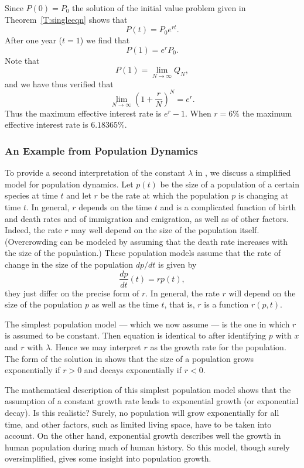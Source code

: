 \documentclass{ximera}
\begin{document}
Since $P(0)=P_0$ the solution of the initial value problem given
in Theorem~\ref{T:singleeqn} shows that
\[
P(t) = P_0 e^{rt}.
\]
After one year ($t=1$) we find that
\[
P(1) =  e^r P_0.
\]
Note that
\[
P(1) = \lim_{N\to\infty} Q_N,
\]
and we have thus verified that
\[
 \lim_{N\to\infty} \left(1 + \frac{r}{N}\right)^N = e^r.
\]
Thus the maximum effective interest rate is $e^r-1$.  When $r=6\%$
the maximum effective interest rate is $6.18365\%$.


\subsubsection*{An Example from Population Dynamics}

To provide a second interpretation of the constant $\lambda$ in
, we discuss a simplified model for population dynamics.
Let $p(t)$ be the size of a population of a certain species at
time $t$ and let $r$ be the rate at which the population $p$ is
changing at time $t$.  In general, $r$ depends on the time $t$
and is a complicated function of birth and death rates and of
immigration and emigration, as well as of other factors.
Indeed, the rate $r$ may well depend
on the size of the population itself.  (Overcrowding can be
modeled by assuming that the death rate increases with the size
of the population.) These population models assume that the
rate of change in the size of the population $dp/dt$ is given by
\begin{equation}  \label{pop_model}
        \frac{dp}{dt}(t) = r p(t),
\end{equation}
they just differ on the precise form of $r$.  In general, the
rate $r$ will depend on the size of the population $p$ as well
as the time $t$, that is, $r$ is a function $r(p,t)$.

The simplest population model --- which
we now assume --- is the
one in which $r$ is assumed to be constant.  Then equation
 is identical to  after identifying $p$
with $x$ and $r$ with $\lambda$.  Hence we may interpret $r$ as
the growth rate for the population.  The form of the solution in
 shows that the size of a population grows
exponentially if $r>0$ and decays exponentially if $r<0$.

The mathematical description of this simplest population model
shows that the assumption of a constant growth rate leads to
exponential growth (or exponential decay).  Is this realistic?
Surely, no population will grow exponentially for all time, and
other factors, such as limited living space, have to be taken
into account.  On the other hand, exponential growth describes
well the growth in human population during much of human
history.  So this model, though surely oversimplified, gives
some insight into population growth.
\end{document}
